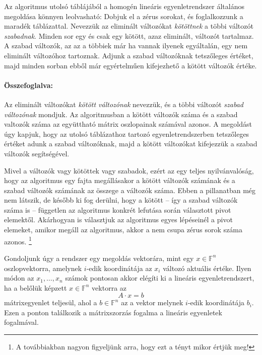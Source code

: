 \documentclass[a4paper, showtrims]{memoir}
\theoremstyle{plain}
\theoremstyle{remark}
\theoremstyle{definition}
\begin{document}
Az algoritmus utolsó táblájából a homogén lineáris egyenletrendszer általános megoldása könnyen leolvasható:
Dobjuk el a zérus sorokat, és foglalkozzunk a maradék táblázattal.
Nevezzük az eliminált változókat \emph{kötöttnek}
a többi változót \emph{szabadnak}.
Minden sor egy és csak egy kötött, azaz eliminált, változót tartalmaz.
A szabad változók, az az a többiek már ha vannak ilyenek egyáltalán, egy nem eliminált változóhoz tartoznak.
Adjunk a szabad változóknak tetszőleges értéket,
majd minden sorban ebből már egyértelműen kifejezhető a kötött változók értéke.

\paragraph{Összefoglalva:}\hspace{-1.em}
Az eliminált változókat
\emph{kötött változónak}
nevezzük,
és a többi változót
\emph{szabad változónak}
mondjuk. 
Az algoritmusban a kötött változók száma és a szabad valtozók száma az együttható mátrix oszlopainak számával azonos.
A megoldást úgy kapjuk, 
hogy az utolsó táblázathoz tartozó egyenletrendszerben tetszőleges értéket adunk a szabad változóknak,
majd a kötött változókat kifejezzük a szabad változók segítségével.

Mivel a változók vagy kötöttek vagy szabadok,
ezért az egy teljes nyilvánvalóság, 
hogy az algoritmus egy fajta megállásakor a kötött változók számának és a szabad változók számának az összege a változók száma.
Ebben a pillanatban még nem látszik,
de később ki fog derülni,
hogy a kötött -- így a szabad változók száma is -- független az algoritmus konkrét lefutása során választott pivot elemektől.
Akárhogyan is választjuk az algoritmus egyes lépéseinél a pivot elemeket,
amikor megáll az algoritmus, akkor a nem csupa zérus sorok száma azonos.
\footnote{A továbbiakban nagyon figyeljünk arra, hogy ezt a tényt mikor értjük meg!}

Gondoljunk úgy a rendszer egy megoldás vektorára, 
mint egy $x\in\mathbb{F}^n$ oszlopvektorra,
amelynek $i$-edik koordinátája az $x_i$ változó aktuális értéke.
Ilyen módon az $x_1,\ldots,x_n$ számok pontosan akkor elégíti ki a lineáris egyenletrendszert,
ha a belőlük képzett $x\in\mathbb{F}^n$ vektorra az
\[
	A\cdot x=b
\]
mátrixegyenlet teljesül, 
ahol a $b\in\mathbb{F}^n$ az a vektor melynek $i$-edik koordinátája $b_i$.
Ezen a ponton találkozik a mátrixszorzás fogalma a lineáris egyenletek fogalmával.
\end{document}
